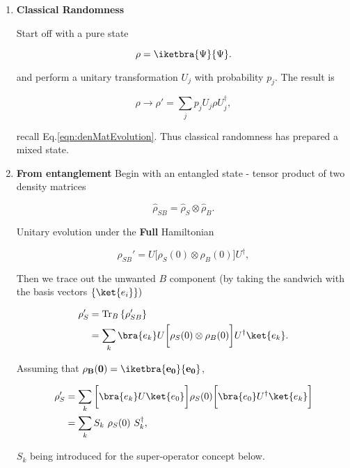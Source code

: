 \begin{enumerate}
\item \textbf{Classical Randomness}

  Start off with a pure state

  \begin{equation}
    \rho = \iketbra{\Psi}{\Psi}.
  \end{equation}

  \noindent and perform a unitary transformation $U_j$ with probability
  $p_j$. The result is

  \begin{equation}
    \rho \rightarrow \rho'=\sum_jp_jU_j\rho U_j^\dagger,
  \end{equation}

  \noindent   recall  Eq.\eqref{eqn:denMatEvolution}.   Thus  classical
  randomness has prepared a mixed state.
\item \textbf{From entanglement} Begin with an entangled state - tensor
  product of two density matrices

  \begin{equation}
    \hat{\rho}_{SB} = \hat{\rho}_{S} \otimes \hat{\rho}_{B}.
  \end{equation}

  Unitary evolution under the \textbf{Full} Hamiltonian

  \begin{equation}
    \rho_{SB}' = U\bigg[\rho_S(0)\otimes\rho_B(0)\bigg]U^\dagger,
  \end{equation}

  \noindent Then we trace out the unwanted $B$ component (by taking the
  sandwich           with          the           basis          vectors
  $\left\lbrace \ket{e_i} \right\rbrace )$

  \begin{equation}
    \begin{aligned}
      \rho'_S & = \text{Tr}_B\left\lbrace\rho_{SB}'\right\rbrace\\
      &                                                               =
      \sum_k\bra{e_k}U\bigg[\rho_S(0)\otimes\rho_B(0)\bigg]U^\dagger\ket{e_k}.
    \end{aligned}
  \end{equation}

  \noindent Assuming that $\mathbf{\rho_B(0) = \iketbra{e_0}{e_0}}$,

  \begin{equation}
    \begin{aligned}
      \rho'_S & = \sum_k\bigg[\bra{e_k}U\ket{e_0}\bigg]\rho_S(0)\bigg[\bra{e_0} U^\dagger\ket{e_k}\bigg]\\
      & = \sum_kS_k\ \rho_S(0)\ S_k^\dagger,
    \end{aligned}
  \end{equation}

  \noindent  $S_k$  being  introduced for  the  super-operator  concept
  below.
\end{enumerate}

